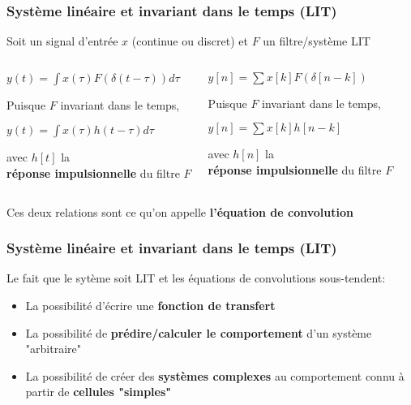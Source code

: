 \documentclass{beamer}
\begin{document}
\begin{frame} 
\frametitle{Système linéaire et invariant dans le temps (LIT) }
Soit un signal d'entrée $x$ (continue ou discret) et $F$ un filtre/système LIT\\
\vspace{1 cm}
\begin{columns}
\column{70mm}
\begin{center}
$y(t) = \int x(\tau) F(\delta(t-\tau) )d\tau$\\
\vspace{0.5cm}

Puisque $F$ invariant dans le temps,\\
\vspace{0.5cm}

$y(t) = \int x(\tau) h(t-\tau) d\tau$\\
\vspace{0.5cm}

avec $h[t]$ la\\ \textbf{réponse impulsionnelle} du filtre $F$

\end{center}

\column{60mm}
\begin{center}

$ y[n] = \sum x[k]  F(\delta[n-k]) $ \\
\vspace{0.5cm}

Puisque $F$ invariant dans le temps,\\
\vspace{0.5cm}

$ y[n] = \sum x[k]  h[n-k] $ \\
\vspace{0.5cm}

avec $h[n]$ la\\ \textbf{réponse impulsionnelle} du filtre $F$

\end{center}
\end{columns}
\begin{block}{}
Ces deux relations sont ce qu'on appelle \textbf{l'équation de convolution}
\end{block}
\end{frame}

\begin{frame}
\frametitle{Système linéaire et invariant dans le temps (LIT)}
Le fait que le sytème soit LIT et les équations de convolutions sous-tendent: \\
\vspace{1cm}
\begin{itemize}
\item La possibilité d'écrire une \textbf{fonction de transfert}
\item La possibilité de \textbf{prédire/calculer le comportement} d'un système "arbitraire"
\item La possibilité de créer des \textbf{systèmes complexes} au comportement connu à partir de \textbf{cellules "simples"}
\end{itemize}

\end{frame} 
\end{document}
